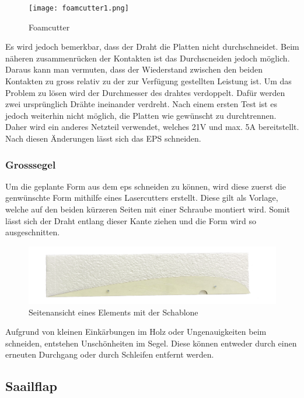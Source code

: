 \begin{figure}[H]
    \centering
    \texttt{[image: foamcutter1.png]}
    \caption{Foamcutter}
    \label{fig:enter-label}
\end{figure}



Es wird jedoch bemerkbar, dass der Draht die Platten nicht durchschneidet. Beim näheren zusammenrücken der Kontakten ist das Durchscneiden jedoch möglich. Daraus kann man vermuten, dass der Wiederstand zwischen den beiden Kontakten zu gross relativ zu der zur Verfügung gestellten Leistung ist. 
Um das Problem zu lösen wird der Durchmesser des drahtes verdoppelt. Dafür werden zwei ursprünglich Drähte ineinander verdreht. Nach einem ersten Test ist es jedoch weiterhin nicht möglich, die Platten wie gewünscht zu durchtrennen. Daher wird ein anderes Netzteil verwendet, welches 21V und max. 5A bereitstellt. Nach diesen Änderungen lässt sich das EPS schneiden. 

\subsubsection*{Grosssegel}
Um die geplante Form aus dem \ac{eps} schneiden zu können, wird diese zuerst die genwünschte Form mithilfe eines Lasercutters erstellt. Diese gilt als Vorlage, welche auf den beiden kürzeren Seiten mit einer Schraube montiert wird. Somit lässt sich der Draht entlang dieser Kante ziehen und die Form wird so ausgeschnitten. \\


\begin{figure}[H]
    \centering
    \includegraphics[width=1\linewidth]{assets/template_on_foam.png}
    \caption{Seitenansicht eines Elements mit der Schablone}
    \label{fig:enter-label}
\end{figure}

Aufgrund von kleinen Einkärbungen im Holz oder Ungenauigkeiten beim schneiden, entstehen Unschönheiten im Segel. Diese können entweder durch einen erneuten Durchgang oder durch Schleifen entfernt werden.
\subsection{Saailflap}



